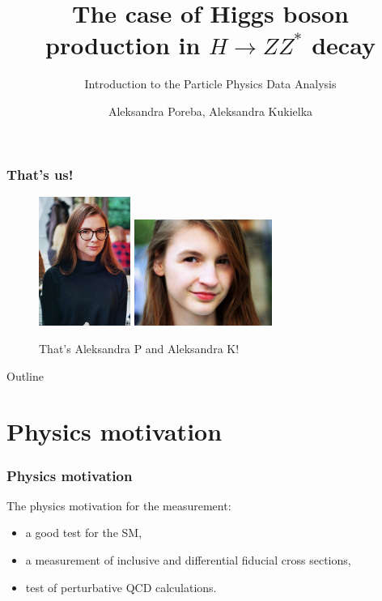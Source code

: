 \documentclass[aspectratio=1610, english]{beamer}
\author[Aleksandra Poreba, Aleksandra Kukielka]{Aleksandra Poreba, Aleksandra Kukielka}
\date{}
\title[The $H \rightarrow ZZ^{*}$ decay analysis]{The case of Higgs boson production in $H \rightarrow ZZ^{*}$ decay}
\subtitle{Introduction to the Particle Physics Data Analysis}
\begin{document}
\maketitle

\begin{frame}
\frametitle{That's us!}

\begin{figure} [H]
\centering
\includegraphics[width=3cm]{zdj1.png} \quad \quad
\includegraphics[width=4.5cm]{zdj2.png}
\caption{ That's Aleksandra P and Aleksandra K!}
\end{figure}

\end{frame}

\begin{frame}{Outline}
	\tableofcontents
\end{frame}

\section{Physics motivation}

\begin{frame}
\frametitle{Physics motivation}
The physics motivation for the measurement:
\begin{itemize}
\item a good test for the SM,
\item a measurement of inclusive and differential fiducial cross sections,
\item test of perturbative QCD calculations.
\end{itemize}

\end{frame}
\end{document}
